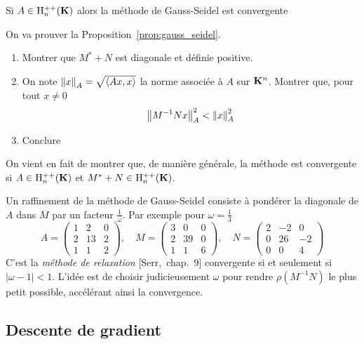 \begin{proposition}
\label{prop:gauss_seidel}
Si $A \in\mathrm{H}^{++}_n(\mathbf{K})  $ alors la méthode de Gauss-Seidel est convergente
\end{proposition}

\begin{exercice}
On va prouver la Proposition~\ref{prop:gauss_seidel}.
\begin{enumerate}
\item Montrer que $M^* + N$ est diagonale et définie positive.
\item On note $\left\|x\right\|_A = \sqrt{\left\langle Ax,x\right\rangle}$ la norme associée à $A$
	sur $\mathbf{K}^{n}$. Montrer que, pour tout $x \neq 0$
\[
\left\|M^{-1}Nx\right\|_{A}^2 < \left\|x\right\|_{A}^2
\]
\item Conclure
\end{enumerate}
\end{exercice}

\begin{remark}
On vient en fait de montrer que, de manière générale, la méthode est
convergente si $A \in \mathrm{H}^{++}_n(\mathbf{K})$ et $M^* + N \in \mathrm{H}^{++}_n(\mathbf{K})$.
\end{remark}
\begin{remark}
Un raffinement de la méthode de Gauss-Seidel consiste à pondérer la diagonale
de $A$ dans $M$ par un facteur $\frac{1}{\omega}$. Par exemple pour $\omega =
\frac{1}{3}$
\[
A = \left(\begin{array}{ccc}
1 & 2 & 0 \\
2 & 13 & 2 \\
1 & 1 & 2
\end{array}\right)
, \quad M = \left(\begin{array}{ccc}
3 & 0 & 0 \\
2 & 39 & 0 \\
1 & 1 & 6
\end{array}\right)
, \quad N = \left(\begin{array}{ccc}
2 & -2 & 0 \\
0 & 26 & -2 \\
0 & 0 & 4
\end{array}\right)
\]
C'est la \emph{méthode de relaxation} [Serr,~chap.~9]
convergente si et seulement si $|\omega-1| < 1$. L'idée est de choisir
judicieusement $\omega$ pour rendre $\rho(M^{-1}N)$ le plus petit possible,
accélérant ainsi la convergence.
\end{remark}

\subsection{Descente de gradient}

